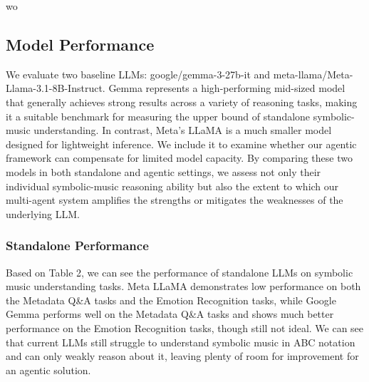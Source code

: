 wo\documentclass[sigconf]{acmart}
\begin{document}
\subsection{Model Performance}
We evaluate two baseline LLMs: google/gemma-3-27b-it and meta-llama/Meta-Llama-3.1-8B-Instruct.
Gemma represents a high-performing mid-sized model that generally achieves strong results across a variety of reasoning tasks, making it a suitable benchmark for measuring the upper bound of standalone symbolic-music understanding. In contrast, Meta's LLaMA is a much smaller model designed for lightweight inference. We include it to examine whether our agentic framework can compensate for limited model capacity. By comparing these two models in both standalone and agentic settings, we assess not only their individual symbolic-music reasoning ability but also the extent to which our multi-agent system amplifies the strengths or mitigates the weaknesses of the underlying LLM.

\subsubsection{Standalone Performance}
Based on Table 2, we can see the performance of standalone LLMs on symbolic music understanding tasks. Meta LLaMA demonstrates low performance on both the Metadata Q&A tasks and the Emotion Recognition tasks, while Google Gemma performs well on the Metadata Q&A tasks and shows much better performance on the Emotion Recognition tasks, though still not ideal. We can see that current LLMs still struggle to understand symbolic music in ABC notation and can only weakly reason about it, leaving plenty of room for improvement for an agentic solution.
\begin{table}[h]
\centering
{}
\end{table}
\end{document}
